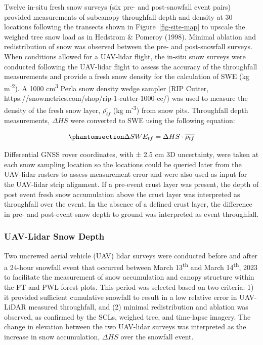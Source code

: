 \documentclass[
  letterpaper,
  DIV=11,
  numbers=noendperiod]{scrartcl}
\begin{document}
Twelve in-situ fresh snow surveys (six pre- and post-snowfall event
pairs) provided measurements of subcanopy throughfall depth and density
at 30 locations following the transects shown in
Figure~\ref{fig-site-map} to upscale the weighed tree snow load as in
Hedstrom \& Pomeroy (1998). Minimal ablation and redistribution of snow
was observed between the pre- and post-snowfall surveys. When conditions
allowed for a UAV-lidar flight, the in-situ snow surveys were conducted
following the UAV-lidar flight to assess the accuracy of the throughfall
measurements and provide a fresh snow density for the calculation of SWE
(kg m\textsuperscript{-2}). A 1000 cm\textsuperscript{3} Perla snow
density wedge sampler (RIP Cutter,
https://snowmetrics.com/shop/rip-1-cutter-1000-cc/) was used to measure
the density of the fresh snow layer, \(\overline{\rho_{tf}}\) (kg
m\textsuperscript{-3}) from snow pits. Throughfall depth measurements,
\(\Delta HS\) were converted to SWE using the following equation:

\begin{equation}\phantomsection\label{eq-swe-tf}{
\Delta SWE_{tf} = \Delta HS \cdot \overline{\rho_{tf}}
}\end{equation}

Differential GNSS rover coordinates, with ± 2.5 cm 3D uncertainty, were
taken at each snow sampling location so the locations could be queried
later from the UAV-lidar rasters to assess measurement error and were
also used as input for the UAV-lidar strip alignment. If a pre-event
crust layer was present, the depth of post event fresh snow accumulation
above the crust layer was interpreted as throughfall over the event. In
the absence of a defined crust layer, the difference in pre- and
post-event snow depth to ground was interpreted as event throughfall.

\subsubsection{UAV-Lidar Snow Depth}\label{uav-lidar-snow-depth}

Two uncrewed aerial vehicle (UAV) lidar surveys were conducted before
and after a 24-hour snowfall event that occurred between March
13\textsuperscript{th} and March 14\textsuperscript{th}, 2023 to
facilitate the measurement of snow accumulation and canopy structure
within the FT and PWL forest plots. This period was selected based on
two criteria: 1) it provided sufficient cumulative snowfall to result in
a low relative error in UAV-LiDAR measured throughfall, and (2) minimal
redistribution and ablation was observed, as confirmed by the SCLs,
weighed tree, and time-lapse imagery. The change in elevation between
the two UAV-lidar surveys was interpreted as the increase in snow
accumulation, \(\Delta HS\) over the snowfall event.
\end{document}
